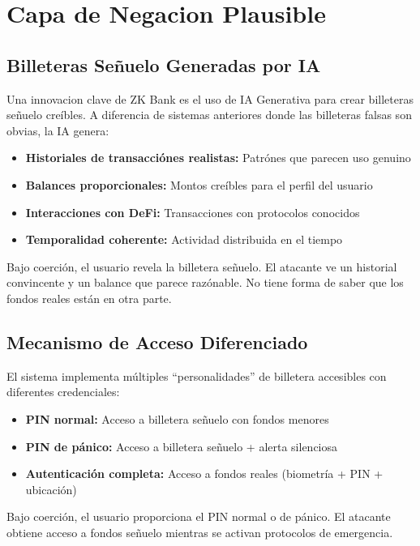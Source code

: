 \documentclass[12pt,a4paper,twoside]{book}
\begin{document}
\section{Capa de Negacion Plausible}

\subsection{Billeteras Señuelo Generadas por IA}

Una innovacion clave de ZK Bank es el uso de IA Generativa para crear billeteras señuelo creíbles. A diferencia de sistemas anteriores donde las billeteras falsas son obvias, la IA genera:

\begin{itemize}
    \item \textbf{Historiales de transacciónes realistas:} Patrónes que parecen uso genuino
    \item \textbf{Balances proporcionales:} Montos creíbles para el perfil del usuario
    \item \textbf{Interacciones con DeFi:} Transacciones con protocolos conocidos
    \item \textbf{Temporalidad coherente:} Actividad distribuida en el tiempo
\end{itemize}

Bajo coerción, el usuario revela la billetera señuelo. El atacante ve un historial convincente y un balance que parece razónable. No tiene forma de saber que los fondos reales están en otra parte.

\subsection{Mecanismo de Acceso Diferenciado}

El sistema implementa múltiples ``personalidades'' de billetera accesibles con diferentes credenciales:

\begin{itemize}
    \item \textbf{PIN normal:} Acceso a billetera señuelo con fondos menores
    \item \textbf{PIN de pánico:} Acceso a billetera señuelo + alerta silenciosa
    \item \textbf{Autenticación completa:} Acceso a fondos reales (biometría + PIN + ubicación)
\end{itemize}

Bajo coerción, el usuario proporciona el PIN normal o de pánico. El atacante obtiene acceso a fondos señuelo mientras se activan protocolos de emergencia.
\end{document}
